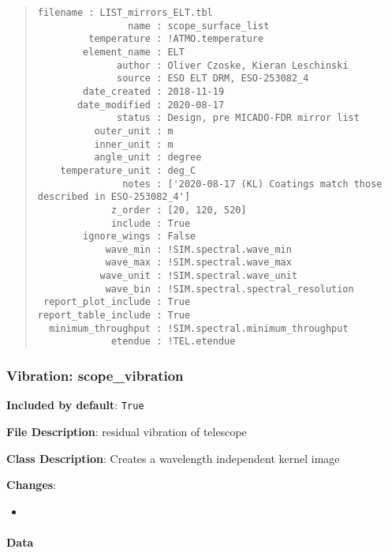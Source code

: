 \begin{quote}
\begin{alltt}
\begin{lstlisting}[frame=single]
            filename : LIST_mirrors_ELT.tbl
                name : scope_surface_list
         temperature : !ATMO.temperature
        element_name : ELT
              author : Oliver Czoske, Kieran Leschinski
              source : ESO ELT DRM, ESO-253082_4
        date_created : 2018-11-19
       date_modified : 2020-08-17
              status : Design, pre MICADO-FDR mirror list
          outer_unit : m
          inner_unit : m
          angle_unit : degree
    temperature_unit : deg_C
               notes : ['2020-08-17 (KL) Coatings match those described in ESO-253082_4']
             z_order : [20, 120, 520]
             include : True
        ignore_wings : False
            wave_min : !SIM.spectral.wave_min
            wave_max : !SIM.spectral.wave_max
           wave_unit : !SIM.spectral.wave_unit
            wave_bin : !SIM.spectral.spectral_resolution
 report_plot_include : True
report_table_include : True
  minimum_throughput : !SIM.spectral.minimum_throughput
             etendue : !TEL.etendue
\end{lstlisting}
\end{alltt}
\end{quote}


\subsubsection{Vibration: \textquotedbl{}scope\_vibration\textquotedbl{}%
  \label{vibration-scope-vibration}%
}

\textbf{Included by default}: \texttt{True}

\textbf{File Description}: residual vibration of telescope

\textbf{Class Description}: Creates a wavelength independent kernel image

\textbf{Changes}:

\begin{itemize}
\item \end{itemize}


\paragraph{Data%
  \label{id1}%
}

\begin{figure}[H]
\noindent{}\label{fig-scope-vibration}
\end{figure}


